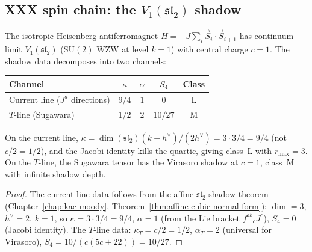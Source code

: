 \subsection{XXX spin chain: the $V_1(\mathfrak{sl}_2)$ shadow}%
\label{subsec:xxx-shadow}

\begin{proposition}%
\label{prop:xxx-shadow-data}
The isotropic Heisenberg antiferromagnet
$H = -J\sum_i \vec{S}_i \cdot \vec{S}_{i+1}$ has continuum limit
$V_1(\mathfrak{sl}_2)$ \textup{(}SU$(2)$ WZW at level $k = 1$\textup{)}
with central charge $c = 1$. The shadow data decomposes into two
channels:
\begin{center}
\renewcommand{\arraystretch}{1.3}
\begin{tabular}{lcccc}
\toprule
Channel & $\kappa$ & $\alpha$ & $S_4$ & Class \\
\midrule
Current line \textup{(}$J^a$ directions\textup{)} & $9/4$ & $1$ & $0$ & L \\
$T$-line \textup{(}Sugawara\textup{)} & $1/2$ & $2$ & $10/27$ & M \\
\bottomrule
\end{tabular}
\end{center}
On the current line, $\kappa = \dim(\mathfrak{sl}_2)(k+h^\vee)/(2h^\vee)
= 3 \cdot 3/4 = 9/4$ \textup{(}not $c/2 = 1/2$\textup{)},
and the Jacobi identity kills the quartic, giving class~L with
$r_{\max} = 3$. On the $T$-line, the Sugawara tensor has the
Virasoro shadow at $c = 1$, class~M with infinite shadow depth.
\end{proposition}

\begin{proof}
The current-line data follows from the affine
$\mathfrak{sl}_2$ shadow theorem
(Chapter~\ref{chap:kac-moody},
Theorem~\ref{thm:affine-cubic-normal-form}): $\dim = 3$,
$h^\vee = 2$, $k = 1$, so $\kappa = 3 \cdot 3/4 = 9/4$,
$\alpha = 1$ (from the Lie bracket $f^{ab}{}_c J^c$),
$S_4 = 0$ (Jacobi identity).
The $T$-line data: $\kappa_T = c/2 = 1/2$, $\alpha_T = 2$
(universal for Virasoro), $S_4 = 10/(c(5c+22)) = 10/27$.
\end{proof}

